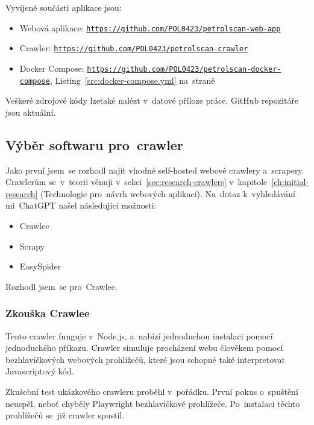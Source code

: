 Vyvíjené součásti aplikace jsou:

\begin{itemize}
    \item Webová aplikace:
        \texttt{\url{https://github.com/POL0423/petrolscan-web-app}}
    \item Crawler:
        \texttt{\url{https://github.com/POL0423/petrolscan-crawler}}
    \item Docker Compose:
        \texttt{\url{https://github.com/POL0423/petrolscan-docker-compose}},
        Listing~\ref{src:docker-compose.yml}
        na~straně~\pageref{src:docker-compose.yml}
\end{itemize}

Veškeré zdrojové kódy lzeťaké nalézt v~datové příloze práce. GitHub
repozitáře jsou aktuální.

\subsection{Výběr softwaru pro~crawler}
\label{sec:crawler-solutions}

Jako první jsem~se rozhodl najít vhodné self-hosted webové crawlery
a~scrapery. Crawlerům se~v~teorii věnuji v~sekci~\ref{sec:research-crawlers}
v~kapitole~\ref{ch:initial-research} (Technologie pro~návrh webových
aplikací). Na~dotaz k~vyhledávání mi~ChatGPT
\cite{givNscvAOqB1nMpq} %
našel následující možnosti:

\begin{itemize}
    \item Crawlee
    \item Scrapy
    \item EasySpider
\end{itemize}

Rozhodl jsem~se pro~Crawlee.

\subsubsection{Zkouška Crawlee}
\label{sec:crawlee-trial}

Tento crawler funguje v~Node.js, a~nabízí jednoduchou instalaci pomocí
jednoduchého příkazu. Crawler simuluje procházení webu člověkem pomocí
bezhlavičkových webových prohlížečů, které jsou schopné také interpretovat
Javascriptový kód.

Zkušební test ukázkového crawleru proběhl v~pořádku.
První pokus o~spuštění neuspěl, neboť chyběly Playwright bezhlavičkové
prohlížeče. Po~instalaci těchto prohlížečů se~již crawler spustil.

